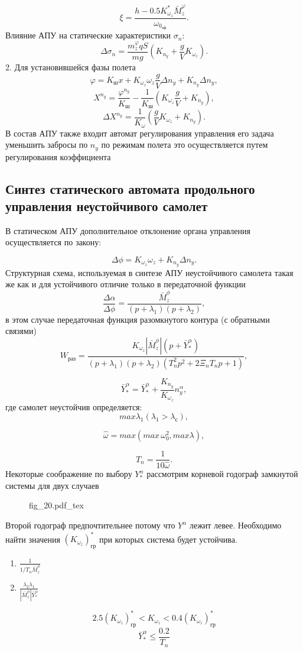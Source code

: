 \documentclass{article}
\begin{document}
\[
    \xi = \frac{h - 0.5 K_{\omega_z}^*
    \bar{M}_z^{\varphi}}{\omega_{0_\text{эф}}}.
\]
Влияние АПУ на статические характеристики $\sigma_n$:
\[
    \Delta \sigma_n = \frac{m_z^\varphi q S}{mg}(K_{n_y} +
    \frac{g}{V}K_{\omega_z}).
\]
2. Для установившейся фазы полета
\[
    \varphi = K_\text{ш}x + K_{\omega_z} \omega_z \frac{g}{V}\Delta n_y +
    K_{n_y} \Delta n_y,
\]
\[
    X^{n_y} = \frac{\varphi^{n_y}}{K_\text{ш}} - \frac{1}{K_\text{ш}}
    (K_{\omega_z} \frac{g}{V} + K_{n_y}),
\]
\[
    \Delta X^{n_y}= \frac{1}{K_\omega} (\frac{g}{V} K_{\omega_z}+ K_{n_y}).
\]
В состав АПУ также входит автомат регулирования управления его задача уменьшить
забросы по $n_y$ по режимам полета это осуществляется путем регулирования
коэффициента
\subsection{Синтез статического автомата продольного управления неустойчивого
самолет}
В статическом АПУ дополнительное отклонение органа управления осуществляется по
закону:

\[
    \Delta \phi = K_{\omega_{z}} \omega_z + K_{n_y} \Delta n_y.
\]
Структурная схема, используемая в синтезе АПУ неустойчивого самолета такая же
как и для устойчивого отличие только в передаточной функции
\[
    {\frac{\Delta \alpha}{\Delta \phi} } =
    \frac{\bar{M}_z^\phi}{(p+\lambda_1)(p+\lambda_2)},
\]
в этом случае передаточная функция разомкнутого контура (с обратными связями)
\[
    W_\text{раз} = \frac{K_{\omega_z} |\bar{M}_z^\phi |(p + \bar{Y}^\alpha_*)
    }{(p+\lambda_1)(p+\lambda_2)(T_n^2 p^2 + 2 \Xi_n T_n p +1)},
\]

\[
    \bar{Y}_*^\alpha = \bar{Y}_*^\alpha + \frac{K_{n_y}}{K_{\omega_z}}
    n_y^\alpha,
\]
где самолет неустойчив определяется:
\[
    max \lambda_1 (\lambda_1 > \lambda_\text{с}),
\]

\[
    \hat{\omega} = max(max \, \omega_0^2, max \lambda),
\]

\[
    T_n = \frac{1}{10 \hat{\omega}}.
\]
Некоторые соображение по выбору $Y_*^\alpha$ рассмотрим корневой годограф
замкнутой системы для двух случаев
\begin{figure}[ht]
    \centering
    {fig_20.pdf_tex}
\end{figure}

Второй годограф предпочтительнее потому что $Y^\alpha$ лежит левее.
Необходимо найти значения $(K_{\omega_z})_\text{гр}^*$ при которых система
будет устойчива.
\begin{enumerate}
    \item $\frac{1}{1/T_n \bar{M}_z^\phi}$
    \item $\frac{\lambda_2 \lambda_1}{| \bar{M}_z^\phi|\bar{Y}_*^\alpha}$
\end{enumerate}
\[
    2.5 (K_{\omega_z})^*_\text{гр} < K_{\omega_z} <
    0.4(K_{\omega_z})^*_\text{гр}
\]
\[
    \bar{Y}_*^\alpha \le \frac{0.2}{T_n}
\]
\end{document}
